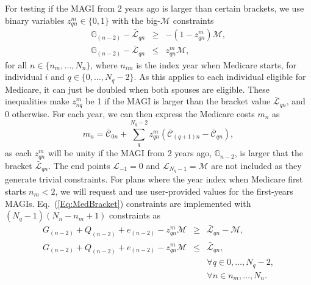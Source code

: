 \documentclass{report}[fleqn,11pt]
\begin{document}
        For testing if the MAGI from 2 years ago is larger than certain brackets,
	we use binary variables $z_{qn}^m \in \{0, 1\}$ with the big-$\mathcal{M}$ constraints
	\begin{eqnarray}
		\label{Eq:MedBracket}
                \mathbb{G}_{(n-2)} - \bar{\mathcal{L}}_{qn} & \geq & -(1 - z_{qn}^m) \mathcal{M}, \nonumber\\
                \mathbb{G}_{(n-2)} - \bar{\mathcal{L}}_{qn} & \leq & z_{qn}^m \mathcal{M},
	\end{eqnarray}
	for all $n \in \{n_m, \ldots, N_n\}$, where $n_{im}$ is the index year when
	Medicare starts, for individual $i$ and $q \in \{0, \ldots, N_q -2\}$.
        As this applies to each individual eligible for Medicare, it can just be doubled
        when both spouses are eligible.
        These inequalities make $z_{nq}^m$ be 1 if
        the MAGI is larger than the bracket value $\bar{\mathcal{L}}_{qn}$, and 0 otherwise.
        For each year, we can then express the Medicare costs $m_n$ as
	\begin{equation}
		m_n = \bar{\mathcal{C}}_{0n}
                + \sum_q^{N_q -2} z_{qn}^m (\bar{\mathcal{C}}_{(q+1)n} - \bar{\mathcal{C}}_{qn}),
	\end{equation}
	as each $z_{qn}^m$ will be unity if the MAGI from 2 years ago, $\mathbb{G}_{n-2}$,
        is larger that the bracket $\bar{\mathcal{L}}_{qn}$.
	The end points $\mathcal{L}_{-1} = 0$ and $\mathcal{L}_{N_q-1} = \mathcal{M}$ are not included
        as they generate trivial constraints.
	For plans where the year index when Medicare first starts $n_m<2$, we will request
	and use user-provided values for the first-years MAGIs.
	Eq.~(\ref{Eq:MedBracket}) constraints are implemented
	with $(N_q -1)(N_n - n_m + 1)$ constraints as
	\begin{eqnarray}
		\label{Eq:MedBracket2}
		G_{(n-2)} + Q_{(n-2)} + e_{(n-2)} - z_{qn}^m \mathcal{M}
                & \geq & \bar{\mathcal{L}}_{qn} - \mathcal{M}, \nonumber\\
		G_{(n-2)} + Q_{(n-2)} + e_{(n-2)} - z_{qn}^m \mathcal{M}
                & \leq & \bar{\mathcal{L}}_{qn}, \nonumber\\
		&&\forall q \in {0, \ldots, N_q-2},\nonumber \\
		&&\forall n \in {n_m, \ldots, N_n}.
	\end{eqnarray}
\end{document}

